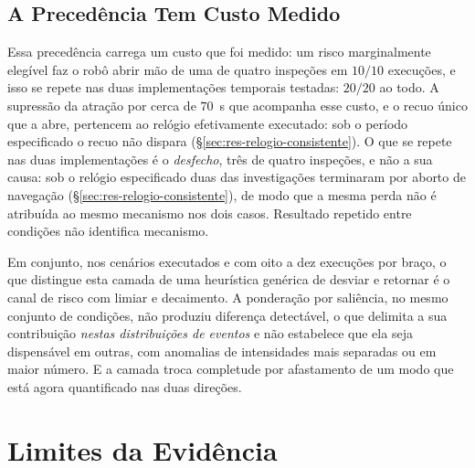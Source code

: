 \subsection{A Precedência Tem Custo Medido}

Essa precedência carrega um custo que foi medido: um risco marginalmente elegível faz o
robô abrir mão de uma de quatro inspeções em $10/10$ execuções, e isso se repete nas
duas implementações temporais testadas: $20/20$ ao todo. A supressão da atração por
cerca de $70$~s que acompanha esse custo, e o recuo único que a abre, pertencem ao
relógio efetivamente executado: sob o período especificado o recuo não dispara
(§\ref{sec:res-relogio-consistente}). O que se repete nas duas implementações é o
\emph{desfecho}, três de quatro inspeções, e não a sua causa: sob o relógio especificado
duas das investigações terminaram por aborto de navegação
(§\ref{sec:res-relogio-consistente}), de modo que a mesma perda não é atribuída ao mesmo
mecanismo nos dois casos. Resultado repetido entre condições não identifica
mecanismo.

Em conjunto, nos cenários executados e com oito a dez execuções por braço, o que
distingue esta camada de uma heurística genérica de desviar e retornar é o canal de
risco com limiar e decaimento. A ponderação por saliência, no mesmo conjunto de
condições, não produziu diferença detectável, o que delimita a sua contribuição
\emph{nestas distribuições de eventos} e não estabelece que ela seja dispensável em
outras, com anomalias de intensidades mais separadas ou em maior número. E a camada
troca completude por afastamento de um modo que está agora quantificado nas duas
direções.

\section{Limites da Evidência}
\label{sec:conc-limites}

